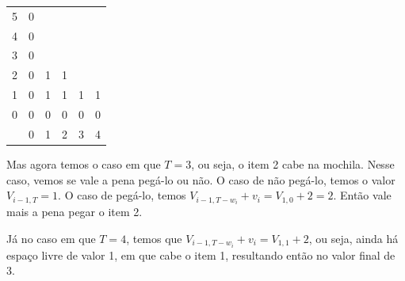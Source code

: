 \begin{example}
	\begin{center}
		\begin{tabular}{c|c|c|c|c|c|}
			\cline{2-6}
			5                                              & 0                     &                       &                       &                       &                       \\ \cline{2-6}
			4                                              & 0                     &                       &                       &                       &                       \\ \cline{2-6}
			3                                              & 0                     &                       &                       &                       &                       \\ \cline{2-6}
			2                                              & 0                     & 1                     & 1                     &                       &                       \\ \cline{2-6}
			1                                              & 0                     & 1                     & 1                     & 1                     & 1                     \\ \cline{2-6}
			0                                              & 0                     & 0                     & 0                     & 0                     & 0                     \\ \cline{2-6}
			\multicolumn{1}{c}{\diagbox[dir=NE]{$i$}{$T$}} & \multicolumn{1}{c}{0} & \multicolumn{1}{c}{1} & \multicolumn{1}{c}{2} & \multicolumn{1}{c}{3} & \multicolumn{1}{c}{4}
		\end{tabular}
	\end{center}

	Mas agora temos o caso em que $T=3$, ou seja, o item 2 cabe na mochila. Nesse caso, vemos se vale a pena pegá-lo ou não. O caso de não pegá-lo, temos o valor $V_{i-1, T} = 1$. O caso de pegá-lo, temos $V_{i-1,  T-w_i}+v_i = V_{1, 0} + 2 = 2$. Então vale mais a pena pegar o item 2.

	Já no caso em que $T=4$, temos que $V_{i-1, T-w_i}+v_i = V_{1, 1} + 2$, ou seja, ainda há espaço livre de valor 1, em que cabe o item 1, resultando então no valor final de 3.


\end{example}
